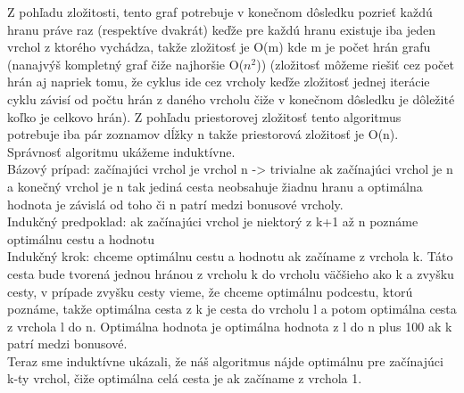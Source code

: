 \documentclass[a4paper]{article}
\begin{document}
Z pohľadu zložitosti, tento graf potrebuje v konečnom dôsledku pozrieť každú hranu práve raz (respektíve dvakrát) keďže pre každú hranu existuje iba jeden vrchol z ktorého vychádza, takže zložitosť je O(m) kde m je počet hrán grafu (nanajvýš kompletný graf čiže najhoršie O($n^2$)) (zložitosť môžeme riešiť cez počet hrán aj napriek tomu, že cyklus ide cez vrcholy keďže zložitosť jednej iterácie cyklu závisí od počtu hrán z daného vrcholu čiže v konečnom dôsledku je dôležité koľko je celkovo hrán). Z pohľadu priestorovej zložitosť tento algoritmus potrebuje iba pár zoznamov dĺžky n takže priestorová zložitosť je O(n).
\\

Správnosť algoritmu ukážeme induktívne. 
\\

Bázový prípad: začínajúci vrchol je vrchol n -> trivialne ak začínajúci vrchol je n a konečný vrchol je n tak jediná cesta neobsahuje žiadnu hranu a optimálna hodnota je závislá od toho či n patrí medzi bonusové vrcholy.
\\

Indukčný predpoklad: ak začínajúci vrchol je niektorý z k+1 až n poznáme optimálnu cestu a hodnotu
\\

Indukčný krok: chceme optimálnu cestu a hodnotu ak začíname z vrchola k. Táto cesta bude tvorená jednou hránou z vrcholu k do vrcholu väčšieho ako k a zvyšku cesty, v prípade zvyšku cesty vieme, že chceme optimálnu podcestu, ktorú poznáme, takže optimálna cesta z k je cesta do vrcholu l a potom optimálna cesta z vrchola l do n. Optimálna hodnota je optimálna hodnota z l do n plus 100 ak k patrí medzi bonusové.
\\

Teraz sme induktívne ukázali, že náš algoritmus nájde optimálnu pre začínajúci k-ty vrchol, čiže optimálna celá cesta je ak začíname z vrchola 1.

  
 
\end{document}
